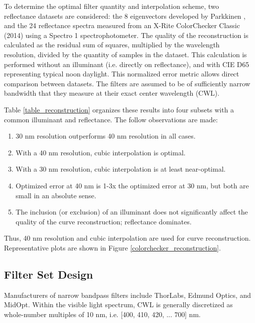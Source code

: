 \documentclass[twocolumn,10pt]{asme2ej}
\newcommand{\id}{\hspace{6 mm}}
\begin{document}
\id To determine the optimal filter quantity and interpolation scheme, two reflectance datasets are considered: the 8 eigenvectors developed by Parkkinen \cite{Parkkinen}, and the 24 reflectance spectra measured from an X-Rite ColorChecker Classic (2014) using a Spectro 1 spectrophotometer. The quality of the reconstruction is calculated as the residual sum of squares, multiplied by the wavelength resolution, divided by the quantity of samples in the dataset. This calculation is performed without an illuminant (i.e. directly on reflectance), and with CIE D65 representing typical noon daylight. This normalized error metric allows direct comparison between datasets. The filters are assumed to be of sufficiently narrow bandwidth that they measure at their exact center wavelength (CWL).

\id Table \ref{table_reconstruction} organizes these results into four subsets with a common illuminant and reflectance. The follow observations are made:

\begin{enumerate}
  \item 30 nm resolution outperforms 40 nm resolution in all cases.
  \item With a 40 nm resolution, cubic interpolation is optimal.
  \item With a 30 nm resolution, cubic interpolation is at least near-optimal.
  \item Optimized error at 40 nm is 1-3x the optimized error at 30 nm, but both are small in an absolute sense.
  \item The inclusion (or exclusion) of an illuminant does not significantly affect the quality of the curve reconstruction; reflectance dominates.
\end{enumerate}

Thus, 40 nm resolution and cubic interpolation are used for curve reconstruction. Representative plots are shown in Figure \ref{colorchecker_reconstruction}.

\subsection{Filter Set Design}

\label{section_filters}

Manufacturers of narrow bandpass filters include ThorLabs, Edmund Optics, and MidOpt. Within the visible light spectrum, CWL is generally discretized as whole-number multiples of 10 nm, i.e. [400, 410, 420, ... 700] nm.
\end{document}
